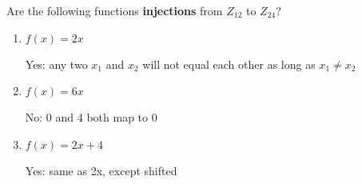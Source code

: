\question Are the following functions \textbf{injections} 
from $Z_{12}$ to $Z_{24}$?
\begin{enumerate}[label=\alph*.]
\item $f(x) = 2x$
\begin{solution}[0.2 in]
Yes: any two $x_1$ and $x_2$ will not equal each other as long as 
$x_1 \neq x_2$
\end{solution}

\item $f(x) = 6x$
\begin{solution}[0.2 in]
No: 0 and 4 both map to 0
\end{solution}

\item $f(x) = 2x + 4$
\begin{solution}[0.2 in]
Yes: same as 2x, except shifted
\end{solution}
\end{enumerate}